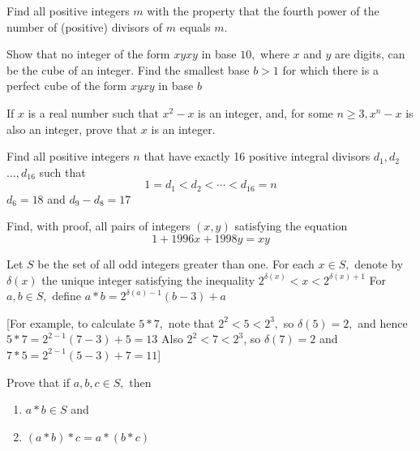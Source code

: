 \documentclass{pset}
\begin{document}
\begin{problems}
\begin{problem}[IrMO 1999 Q9]
    Find all positive integers \(m\) with the property that the fourth power of the number of (positive) divisors of \(m\) equals \(m\).
\end{problem}

\begin{problem}[IrMO 1998 Q3]
    Show that no integer of the form \(x y x y\) in base \(10,\) where \(x\) and \(y\) are digits, can be the cube of an integer. Find the smallest base \(b>1\) for which there is a perfect cube of the form \(x y x y\) in base \(b\)
\end{problem}

\begin{problem}[IrMO 1998 Q5]
    If \(x\) is a real number such that \(x^{2}-x\) is an integer, and, for some \(n \geq 3, x^{n}-x\) is also an integer, prove that \(x\) is an integer.
\end{problem}

\begin{problem}[IrMO 1998 Q6]
    Find all positive integers \(n\) that have exactly 16 positive integral divisors \(d_{1}, d_{2}\)
    \(\ldots, d_{16}\) such that
    $$
    1=d_{1}<d_{2}<\cdots<d_{16}=n
    $$
    \(d_{6}=18\) and \(d_{9}-d_{8}=17\)
\end{problem}

\begin{problem}[IrMO 1997 Q1]
    Find, with proof, all pairs of integers \((x, y)\) satisfying the equation
    $$
    1+1996 x+1998 y=x y
    $$
\end{problem}

\begin{problem}[IrMO 1997 Q5]
    Let \(S\) be the set of all odd integers greater than one. For each \(x \in S,\) denote by
    \(\delta(x)\) the unique integer satisfying the inequality \(2^{\delta(x)}<x<2^{\delta(x)+1}\)
    For \(a, b \in S,\) define \(a * b=2^{\delta(a)-1}(b-3)+a\)

    [For example, to calculate \(5 * 7,\) note that \(2^{2}<5<2^{3},\) so \(\delta(5)=2,\) and hence \(5 * 7=2^{2-1}(7-3)+5=13 \) Also  \(2^{2}<7<2^{3}\),  so $\delta(7)=2$ and $7 * 5=2^{2-1}(5-3)+7=11$]

    Prove that if \(a, b, c \in S,\) then
    \begin{enumerate}
        \item \(a * b \in S\) and
        \item \((a * b) * c=a *(b * c)\) 
    \end{enumerate}
\end{problem}


\end{problems}
\end{document}
